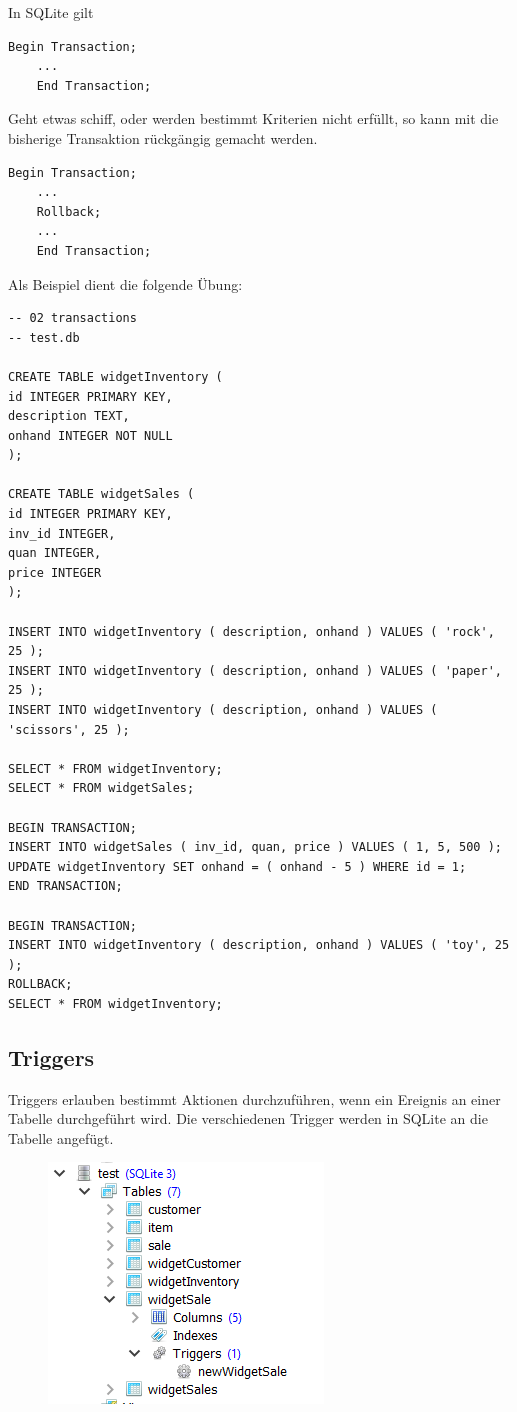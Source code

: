 In SQLite gilt
\begin{lstlisting}[style=SQL]
	Begin Transaction;
	...
	End Transaction;
\end{lstlisting}

Geht etwas schiff, oder werden bestimmt Kriterien nicht erfüllt, so kann mit  die bisherige Transaktion rückgängig gemacht werden. 
\begin{lstlisting}[style=SQL]
	Begin Transaction;
	...
	Rollback;
	...
	End Transaction;
\end{lstlisting}

Als Beispiel dient die folgende Übung:
\begin{lstlisting}[style=SQL]
-- 02 transactions
-- test.db

CREATE TABLE widgetInventory (
id INTEGER PRIMARY KEY,
description TEXT,
onhand INTEGER NOT NULL
);

CREATE TABLE widgetSales (
id INTEGER PRIMARY KEY,
inv_id INTEGER,
quan INTEGER,
price INTEGER
);

INSERT INTO widgetInventory ( description, onhand ) VALUES ( 'rock', 25 );
INSERT INTO widgetInventory ( description, onhand ) VALUES ( 'paper', 25 );
INSERT INTO widgetInventory ( description, onhand ) VALUES ( 'scissors', 25 );

SELECT * FROM widgetInventory;
SELECT * FROM widgetSales;

BEGIN TRANSACTION;
INSERT INTO widgetSales ( inv_id, quan, price ) VALUES ( 1, 5, 500 );
UPDATE widgetInventory SET onhand = ( onhand - 5 ) WHERE id = 1;
END TRANSACTION;

BEGIN TRANSACTION;
INSERT INTO widgetInventory ( description, onhand ) VALUES ( 'toy', 25 );
ROLLBACK;
SELECT * FROM widgetInventory;
\end{lstlisting}

\subsection{Triggers}
Triggers erlauben bestimmt Aktionen durchzuführen, wenn ein Ereignis an einer Tabelle durchgeführt wird. Die verschiedenen Trigger werden in SQLite an die Tabelle angefügt.
\begin{figure}[H]
	\centering
	\includegraphics[scale = 0.6]{attachment/chapter_3/Scc064}
	\caption{}
	\label{fig:Scc064}
\end{figure}

